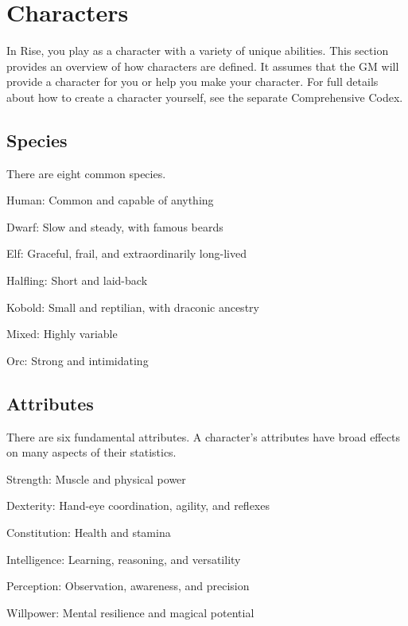 \chapter{Characters}\label{Characters}

In Rise, you play as a character with a variety of unique abilities.
This section provides an overview of how characters are defined.
It assumes that the GM will provide a character for you or help you make your character.
For full details about how to create a character yourself, see the separate Comprehensive Codex.

\section{Species}
  There are eight common species.
  \begin{raggeditemize}
    \item Human: Common and capable of anything
    \item Dwarf: Slow and steady, with famous beards
    \item Elf: Graceful, frail, and extraordinarily long-lived
    \item Halfling: Short and laid-back
    \item Kobold: Small and reptilian, with draconic ancestry
    \item Mixed: Highly variable
    \item Orc: Strong and intimidating
  \end{raggeditemize}

\section{Attributes}
  There are six fundamental attributes.
  A character's attributes have broad effects on many aspects of their statistics.
  \begin{raggeditemize}
    \item Strength: Muscle and physical power
    \item Dexterity: Hand-eye coordination, agility, and reflexes
    \item Constitution: Health and stamina
    \item Intelligence: Learning, reasoning, and versatility
    \item Perception: Observation, awareness, and precision
    \item Willpower: Mental resilience and magical potential
  \end{raggeditemize}


